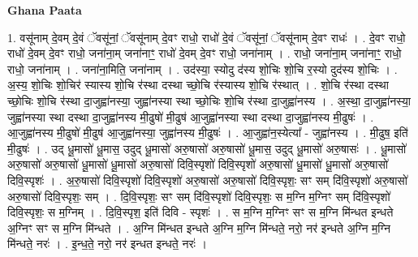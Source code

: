 \documentclass[17pt]{extarticle}
\begin{document}
\textbf{Ghana Paata } \newline

1. वसू॑नाम् दे॒वम् दे॒वं ॅवसू॑नां॒ ॅवसू॑नाम् दे॒वꣳ राधो॒ राधो॑ दे॒वं ॅवसू॑नां॒ ॅवसू॑नाम् दे॒वꣳ राधः॑ । . दे॒वꣳ राधो॒ राधो॑ दे॒वम् दे॒वꣳ राधो॒ जना॑ना॒म् जना॑नाꣳ॒॒ राधो॑ दे॒वम् दे॒वꣳ राधो॒ जना॑नाम् । . राधो॒ जना॑ना॒म् जना॑नाꣳ॒॒ राधो॒ राधो॒ जना॑नाम् । . जना॑ना॒मिति॒ जना॑नाम् । . उद॑स्या॒ स्योदु द॑स्य शो॒चिः शो॒चि र॒स्यो दुद॑स्य शो॒चिः । . अ॒स्य॒ शो॒चिः शो॒चिर॑ स्यास्य शो॒चि र॑स्था दस्था च्छो॒चि र॑स्यास्य शो॒चि र॑स्थात् । . शो॒चि र॑स्था दस्था च्छो॒चिः शो॒चि र॑स्था दा॒जुह्वा॑नस्या॒ जुह्वा॑नस्या स्था च्छो॒चिः शो॒चि र॑स्था दा॒जुह्वा॑नस्य । . अ॒स्था॒ दा॒जुह्वा॑नस्या॒ जुह्वा॑नस्या स्था दस्था दा॒जुह्वा॑नस्य मी॒ढुषो॑ मी॒ढुष॑ आ॒जुह्वा॑नस्या 
स्था दस्था दा॒जुह्वा॑नस्य मी॒ढुषः॑ । . आ॒जुह्वा॑नस्य मी॒ढुषो॑ मी॒ढुष॑ आ॒जुह्वा॑नस्या॒ जुह्वा॑नस्य मी॒ढुषः॑ । . आ॒जुह्वा॑न॒स्येत्या᳚ - जुह्वा॑नस्य । . मी॒ढुष॒ इति॑ मी॒ढुषः॑ । . उद् धू॒मासो॑ धू॒मास॒ उदुद् धू॒मासो॑ अरु॒षासो॑ अरु॒षासो॑ धू॒मास॒ उदुद् धू॒मासो॑ अरु॒षासः॑ । . धू॒मासो॑ अरु॒षासो॑ अरु॒षासो॑ धू॒मासो॑ धू॒मासो॑ अरु॒षासो॑ दिवि॒स्पृशो॑ दिवि॒स्पृशो॑ अरु॒षासो॑ धू॒मासो॑ धू॒मासो॑ अरु॒षासो॑ दिवि॒स्पृशः॑ । . अ॒रु॒षासो॑ दिवि॒स्पृशो॑ दिवि॒स्पृशो॑ अरु॒षासो॑ अरु॒षासो॑ दिवि॒स्पृशः॒ सꣳ सम् 
दि॑वि॒स्पृशो॑ अरु॒षासो॑ अरु॒षासो॑ दिवि॒स्पृशः॒ सम् । . दि॒वि॒स्पृशः॒ सꣳ सम् दि॑वि॒स्पृशो॑ दिवि॒स्पृशः॒ स म॒ग्नि म॒ग्निꣳ सम् दि॑वि॒स्पृशो॑ दिवि॒स्पृशः॒ स म॒ग्निम् । . दि॒वि॒स्पृश॒ इति॑ दिवि - स्पृशः॑ । . स म॒ग्नि म॒ग्निꣳ सꣳ स म॒ग्नि मि॑न्धत इन्धते अ॒ग्निꣳ सꣳ स म॒ग्नि मि॑न्धते । . अ॒ग्नि मि॑न्धत इन्धते अ॒ग्नि म॒ग्नि मि॑न्धते॒ नरो॒ नर॑ इन्धते अ॒ग्नि म॒ग्नि मि॑न्धते॒ नरः॑ । . इ॒न्ध॒ते॒ नरो॒ नर॑ इन्धत इन्धते॒ नरः॑ । \newline
\end{document}
